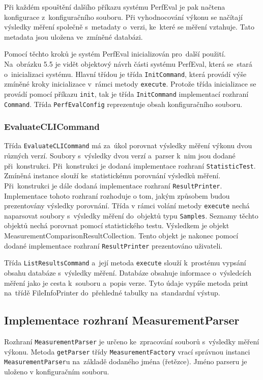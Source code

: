 Při každém spouštění dalšího příkazu systému PerfEval je pak načtena konfigurace z~konfiguračního souboru.
Při vyhodnocování výkonu se načítají výsledky měření společně s~metadaty o~verzi, ke~které se měření vztahuje.
Tato metadata jsou uložena ve~zmíněné databázi.

Pomocí těchto kroků je systém PerfEval inicializován pro~další použití.
Na~obrázku 5.5 je vidět objektový návrh části systému PerfEval, která se~stará o~inicializaci systému.
Hlavní třídou je třída \lstinline|InitCommand|, která provádí výše zmíněné kroky inicializace v~rámci metody \lstinline|execute|.
Protože třída inicializace se provádí pomocí příkazu \texttt{init}, tak je třída \lstinline|InitCommand| implementací rozhraní \lstinline|Command|.
Třída \lstinline|PerfEvalConfig| reprezentuje obsah konfiguračního souboru.


\subsubsection{EvaluateCLICommand}
Třída \lstinline{EvaluateCLICommand} má za~úkol porovnat výsledky měření výkonu dvou různých verzí.
Soubory s~výsledky dvou verzí a~parser k~nim jsou dodané při~konstrukci. Při~konstrukci
je dodaná implementace rozhraní \lstinline{StatisticTest}. Zmíněná instance slouží ke~statistickému
porovnání výsledků měření. Při~konstrukci je dále dodaná implementace rozhraní \lstinline{ResultPrinter}.
Implementace tohoto rozhraní rozhoduje o tom, jakým způsobem budou prezentovány výsledky porovnání.
Třída v rámci volání metody \lstinline{execute} nechá naparsovat soubory s~výsledky měření do~objektů typu \lstinline{Samples}.
Seznamy těchto objektů nechá porovnat pomocí statistického testu. Výsledkem je objekt MeasurementComparisonResultCollection.
Tento objekt je nakonec pomocí dodané implementace rozhraní \lstinline{ResultPrinter} prezentováno uživateli.

Třída \lstinline{ListResultsCommand} a~její metoda \lstinline{execute} slouží k~prostému vypsání obsahu databáze s~výsledky měření.
Databáze obsahuje informace o~výsledcích měření jako je cesta k~souboru a~popis verze. Tyto údaje vypíše
metoda print na~třídě FileInfoPrinter do~přehledné tabulky na~standardní výstup.

\subsection{Implementace rozhraní MeasurementParser}

Rozhraní \lstinline{MeasurementParser} je určeno ke~zpracování souborů s~výsledky měření výkonu.
Metoda \lstinline{getParser} třídy \lstinline{MeasurementFactory} vrací správnou instanci \lstinline{MeasurementParser}u na~základě dodaného jména (řetězce).
Jméno parseru je uloženo v konfiguračním souboru.

